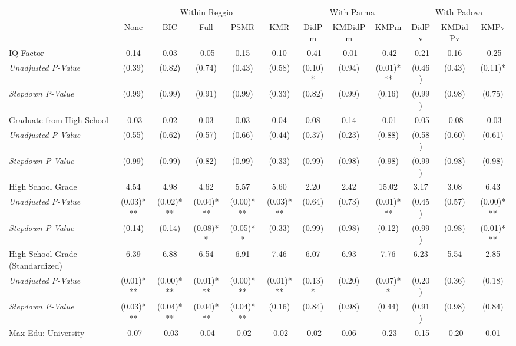 \begin{tabular}{l c c c c c c c c c c c}
\toprule
& \multicolumn{5}{c}{Within Reggio} & \multicolumn{3}{c}{With Parma} & \multicolumn{3}{c}{With Padova} \\\cmidrule(lr){2-6} \cmidrule(lr){7-9} \cmidrule(lr){10-12}
 & None & BIC & Full & PSMR & KMR & DidPm & KMDidPm & KMPm & DidPv & KMDidPv & KMPv \\
\midrule
IQ Factor & 0.14 & 0.03 & -0.05 & 0.15 & 0.10 & -0.41 & -0.01 & -0.42 & -0.21 & 0.16 & -0.25 \\
\quad \textit{Unadjusted P-Value} & (0.39) & (0.82) & (0.74) & (0.43) & (0.58) & (0.10)* & (0.94) & (0.01)*** & (0.46) & (0.43) & (0.11)* \\
\quad \textit{Stepdown P-Value} & (0.99) & (0.99) & (0.91) & (0.99) & (0.33) & (0.82) & (0.99) & (0.16) & (0.99) & (0.98) & (0.75) \\
Graduate from High School & -0.03 & 0.02 & 0.03 & 0.03 & 0.04 & 0.08 & 0.14 & -0.01 & -0.05 & -0.08 & -0.03 \\
\quad \textit{Unadjusted P-Value} & (0.55) & (0.62) & (0.57) & (0.66) & (0.44) & (0.37) & (0.23) & (0.88) & (0.58) & (0.60) & (0.61) \\
\quad \textit{Stepdown P-Value} & (0.99) & (0.99) & (0.82) & (0.99) & (0.33) & (0.99) & (0.98) & (0.98) & (0.99) & (0.98) & (0.98) \\
High School Grade & 4.54 & 4.98 & 4.62 & 5.57 & 5.60 & 2.20 & 2.42 & 15.02 & 3.17 & 3.08 & 6.43 \\
\quad \textit{Unadjusted P-Value} & (0.03)*** & (0.02)*** & (0.04)*** & (0.00)*** & (0.03)*** & (0.64) & (0.73) & (0.01)*** & (0.45) & (0.57) & (0.00)*** \\
\quad \textit{Stepdown P-Value} & (0.14) & (0.14) & (0.08)** & (0.05)** & (0.33) & (0.99) & (0.98) & (0.12) & (0.99) & (0.98) & (0.01)*** \\
High School Grade (Standardized) & 6.39 & 6.88 & 6.54 & 6.91 & 7.46 & 6.07 & 6.93 & 7.76 & 6.23 & 5.54 & 2.85 \\
\quad \textit{Unadjusted P-Value} & (0.01)*** & (0.00)*** & (0.01)*** & (0.00)*** & (0.01)*** & (0.13)* & (0.20) & (0.07)** & (0.20) & (0.36) & (0.18) \\
\quad \textit{Stepdown P-Value} & (0.03)*** & (0.04)*** & (0.04)*** & (0.04)*** & (0.16) & (0.84) & (0.98) & (0.44) & (0.91) & (0.98) & (0.84) \\
Max Edu: University & -0.07 & -0.03 & -0.04 & -0.02 & -0.02 & -0.02 & 0.06 & -0.23 & -0.15 & -0.20 & 0.01 \\

\end{tabular}
